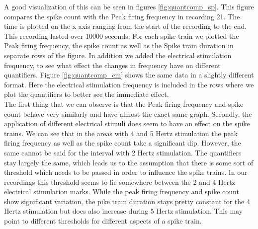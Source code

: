 A good visualization of this can be seen in figures \ref{fig:quantcomp_sp}. This figure compares the spike count with the Peak firing frequency in recording 21. The time is plotted on the x axis ranging from the start of the recording to the end. This recording lasted over 10000 seconds. For each spike train we plotted the Peak firing frequency, the spike count as well as the Spike train duration in separate rows of the figure. In addition we added the electrical stimulation frequency, to see what effect the changes in frequency have on different quantifiers. Figure \ref{fig:quantcomp_cm} shows the same data in a slightly different format. Here the electrical stimulation frequency is included in the rows where we plot the quantifiers to better see the immediate effect.\\
The first thing that we can observe is that the Peak firing frequency and spike count behave very similarly and have almost the exact same graph. Secondly, the application of different electrical stimuli does seem to have an effect on the spike trains. We can see that in the areas with 4 and 5 Hertz stimulation the peak firing frequency as well as the spike count take a significant dip. However, the same cannot be said for the interval with 2 Hertz stimulation. The quantifiers stay largely the same, which leads us to the assumption that there is some sort of threshold which needs to be passed in order to influence the spike trains. In our recordings this threshold seems to lie somewhere between the 2 and 4 Hertz electrical stimulation marks.
While the peak firing frequency and spike count show significant variation, the pike train duration stays pretty constant for the 4 Hertz stimulation but does also increase during 5 Hertz stimulation. This may point to different thresholds for different aspects of a spike train.

